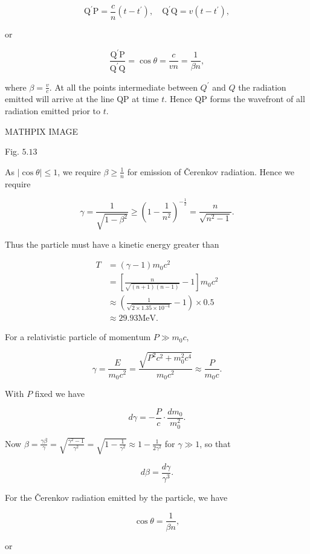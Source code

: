\documentclass[10pt]{article}
\begin{document}
$$
\mathrm{Q}^{\prime} \mathrm{P}=\frac{c}{n}\left(t-t^{\prime}\right), \quad \mathrm{Q}^{\prime} \mathrm{Q}=v\left(t-t^{\prime}\right),
$$

or

$$
\frac{\mathrm{Q}^{\prime} \mathrm{P}}{\mathrm{Q}^{\prime} \mathrm{Q}}=\cos \theta=\frac{c}{v n}=\frac{1}{\beta n},
$$

where $\beta=\frac{v}{c}$. At all the points intermediate between $Q^{\prime}$ and $Q$ the radiation emitted will arrive at the line QP at time $t$. Hence QP forms the wavefront of all radiation emitted prior to $t$.

MATHPIX IMAGE

Fig. $5.13$

 As $|\cos \theta| \leq 1$, we require $\beta \geq \frac{1}{n}$ for emission of Čerenkov radiation. Hence we require

$$
\gamma=\frac{1}{\sqrt{1-\beta^{2}}} \geq\left(1-\frac{1}{n^{2}}\right)^{-\frac{1}{2}}=\frac{n}{\sqrt{n^{2}-1}} .
$$



Thus the particle must have a kinetic energy greater than

$$
\begin{aligned}
T &=(\gamma-1) m_{0} c^{2} \\
&=\left[\frac{n}{\sqrt{(n+1)(n-1)}}-1\right] m_{0} c^{2} \\
& \approx\left(\frac{1}{\sqrt{2 \times 1.35 \times 10^{-4}}}-1\right) \times 0.5 \\
& \approx 29.93 \mathrm{MeV} .
\end{aligned}
$$

 For a relativistic particle of momentum $P \gg m_{0} c$,

$$
\gamma=\frac{E}{m_{0} c^{2}}=\frac{\sqrt{P^{2} c^{2}+m_{0}^{2} c^{4}}}{m_{0} c^{2}} \approx \frac{P}{m_{0} c} .
$$

With $P$ fixed we have

$$
d \gamma=-\frac{P}{c} \cdot \frac{d m_{0}}{m_{0}^{2}} .
$$

Now $\beta=\frac{\gamma \beta}{\gamma}=\sqrt{\frac{\gamma^{2}-1}{\gamma^{2}}}=\sqrt{1-\frac{1}{\gamma^{2}}} \approx 1-\frac{1}{2 \gamma^{2}}$ for $\gamma \gg 1$, so that

$$
d \beta=\frac{d \gamma}{\gamma^{3}} .
$$

For the Čerenkov radiation emitted by the particle, we have

$$
\cos \theta=\frac{1}{\beta n},
$$

or
\end{document}
